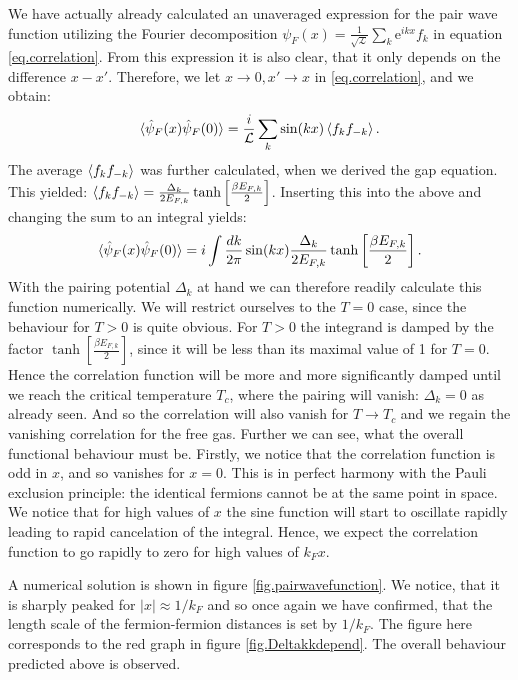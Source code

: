 We have actually already calculated an unaveraged expression for the pair wave function utilizing the Fourier decomposition $\psi_F(x) = \frac{1}{\sqrt{\mathcal{L}}} \sum_k \text{e}^{ikx} f_k$ in equation \eqref{eq.correlation}. From this expression it is also clear, that it only depends on the difference $x-x'$. Therefore, we let $x \to 0, x' \to x$ in \eqref{eq.correlation}, and we obtain:
\begin{equation}
\braket{\hat{\psi}_F(x) \hat{\psi}_F(0)} = \frac{i}{\mathcal{L}}\sum_{k} \sin(kx)\braket{f_{k}f_{-k}}. \nonumber
\end{equation}
The average $\braket{f_{k}f_{-k}}$ was further calculated, when we derived the gap equation. This yielded: $\braket{f_{k}f_{-k}} = \frac{\Delta_k}{2E_{F,k}}\tanh\left[\frac{\beta E_{F,k} }{2}\right]$. Inserting this into the above and changing the sum to an integral yields:
\begin{equation}
\braket{\hat{\psi}_F(x) \hat{\psi}_F(0)} = i\int \frac{dk}{2\pi} \sin(kx)\frac{\Delta_k}{2E_{F,k}}\tanh\left[\frac{ \beta E_{F,k} }{2}\right].
\label{eq.pairwavefunction}
\end{equation}
With the pairing potential $\Delta_k$ at hand we can therefore readily calculate this function numerically. We will restrict ourselves to the $T = 0$ case, since the behaviour for $T > 0$ is quite obvious. For $T > 0$ the integrand is damped by the factor $\tanh\left[\frac{ \beta E_{F,k} }{2}\right]$, since it will be less than its maximal value of 1 for $T = 0$. Hence the correlation function will be more and more significantly damped until we reach the critical temperature $T_c$, where the pairing will vanish: $\Delta_k = 0$ as already seen. And so the correlation will also vanish for $T\to T_c$ and we regain the vanishing correlation for the free gas. Further we can see, what the overall functional behaviour must be. Firstly, we notice that the correlation function is odd in $x$, and so vanishes for $x = 0$. This is in perfect harmony with the Pauli exclusion principle: the identical fermions cannot be at the same point in space. We notice that for high values of $x$ the sine function will start to oscillate rapidly leading to rapid cancelation of the integral. Hence, we expect the correlation function to go rapidly to zero for high values of $k_F x$. 

A numerical solution is shown in figure \ref{fig.pairwavefunction}. We notice, that it is sharply peaked for $|x| \approx 1/k_F$ and so once again we have confirmed, that the length scale of the fermion-fermion distances is set by $1/k_F$. The figure here corresponds to the red graph in figure \ref{fig.Deltakkdepend}. The overall behaviour predicted above is observed. %

